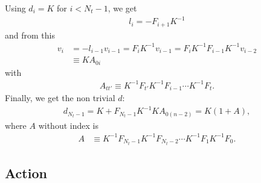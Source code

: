 \documentclass[a4paper, fleqn, twoside, notitlepage]{scrartcl}
\begin{document}
\noindent
Using $d_i = K$ for $i < N_t-1$, we get
\begin{align}
  l_i = - F_{i+1} K^{-1}\label{eq:mlu_l}
\end{align}
and from this
\begin{align}
  v_i &= -l_{i-1}v_{i-1} = F_i K^{-1} v_{i-1} = F_i K^{-1} F_{i-1} K^{-1} v_{i-2}\\
      &\equiv K A_{0i}\label{eq:mlu_v}
\end{align}
with
\begin{align}
  A_{tt'} \equiv K^{-1} F_{t'} K^{-1} F_{i-1} \cdots K^{-1} F_t.\label{eq:def_partial_A}
\end{align}
Finally, we get the non trivial $d$:
\begin{align}
  d_{N_t-1} = K + F_{N_t-1} K^{-1} K A_{0(n-2)} = K (1 + A),
\end{align}
where $A$ without index is
\begin{align}
  A &\equiv K^{-1}F_{N_t-1}K^{-1} F_{N_t-2} \cdots K^{-1}F_{1}K^{-1} F_{0}.\label{eq:def_A}
\end{align}

\subsection{Action}
\end{document}
